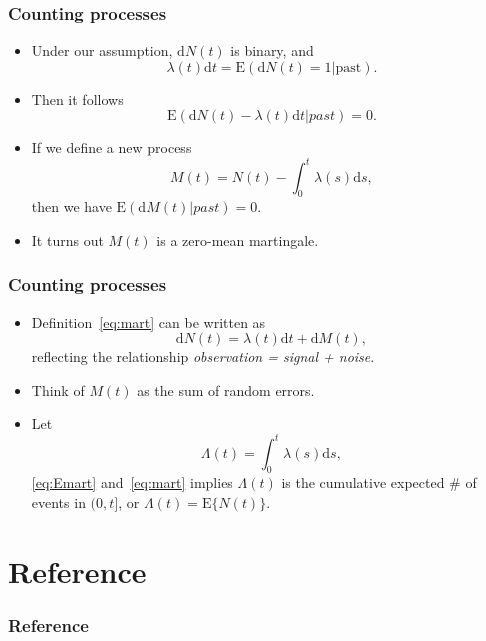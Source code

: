\documentclass[10pt]{beamer}\usepackage[]{graphicx}\usepackage[]{color}
\newcommand{\dif}{\mathrm{d}}
\newcommand{\dt}{\mathrm{d}t}
\newcommand{\E}{\mathrm{E}}
\begin{document}
\begin{frame}
  \frametitle{Counting processes}
  \begin{itemize}  
  \item Under our assumption, $\dif N(t)$ is binary, and 
    $$\lambda(t) \dt = \E(\dif N(t) = 1|\mbox{past}).$$
  \item Then it follows
    \begin{equation}
      \label{eq:Emart}
      \E(\dif N(t) - \lambda(t) \dt |past) = 0.
    \end{equation}
  \item If we define a new process 
    \begin{equation}
      \label{eq:mart}
      M(t) = N(t) - \int_0^t\lambda(s) \dif s,
    \end{equation}
    then we have $\E(\dif M(t) | past) = 0$.
  \item It turns out $M(t)$ is a zero-mean martingale.
  \end{itemize}
\end{frame}

\begin{frame}
  \frametitle{Counting processes}
  \begin{itemize}  
  \item Definition~\eqref{eq:mart} can be written as
    $$\dif N(t) = \lambda(t) \dif t + \dif M(t),$$
    reflecting the relationship \emph{observation = signal + noise}.
  \item Think of $M(t)$ as the sum of random errors.
  \item Let 
    $$\Lambda(t) = \int_0^t\lambda(s)\dif s,$$
    \eqref{eq:Emart} and~\eqref{eq:mart} implies $\Lambda(t)$ is the cumulative expected \# of events in $(0, t]$, 
    or $\Lambda(t) = \E\{N(t)\}$.
  \end{itemize}
\end{frame}    
    

\section{Reference}
\begin{frame}[shrink = 25]
\frametitle{Reference}
\begin{center}
\scriptsize


\end{center}
\end{frame}
\end{document}
